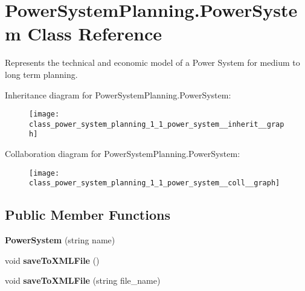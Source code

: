 \hypertarget{class_power_system_planning_1_1_power_system}{}\section{Power\+System\+Planning.\+Power\+System Class Reference}
\label{class_power_system_planning_1_1_power_system}


Represents the technical and economic model of a Power System for medium to long term planning.  




Inheritance diagram for Power\+System\+Planning.\+Power\+System\+:\nopagebreak
\begin{figure}[H]
\begin{center}
\leavevmode
\texttt{[image: class\_power\_system\_planning\_1\_1\_power\_system\_\_inherit\_\_graph]}
\end{center}
\end{figure}


Collaboration diagram for Power\+System\+Planning.\+Power\+System\+:\nopagebreak
\begin{figure}[H]
\begin{center}
\leavevmode
\texttt{[image: class\_power\_system\_planning\_1\_1\_power\_system\_\_coll\_\_graph]}
\end{center}
\end{figure}
\subsection*{Public Member Functions}
\begin{DoxyCompactItemize}
\item 
{\bfseries Power\+System} (string name)\hypertarget{class_power_system_planning_1_1_power_system_a6892a52047756c1fc3cf988695e1b787}{}\label{class_power_system_planning_1_1_power_system_a6892a52047756c1fc3cf988695e1b787}

\item 
void {\bfseries save\+To\+X\+M\+L\+File} ()\hypertarget{class_power_system_planning_1_1_power_system_a1dcf959a68f094d9a1ca93170684e87f}{}\label{class_power_system_planning_1_1_power_system_a1dcf959a68f094d9a1ca93170684e87f}

\item 
void {\bfseries save\+To\+X\+M\+L\+File} (string file\+\_\+name)\hypertarget{class_power_system_planning_1_1_power_system_a0dc662149c054524af6e58bc3b96fbd8}{}\label{class_power_system_planning_1_1_power_system_a0dc662149c054524af6e58bc3b96fbd8}

\end{DoxyCompactItemize}
